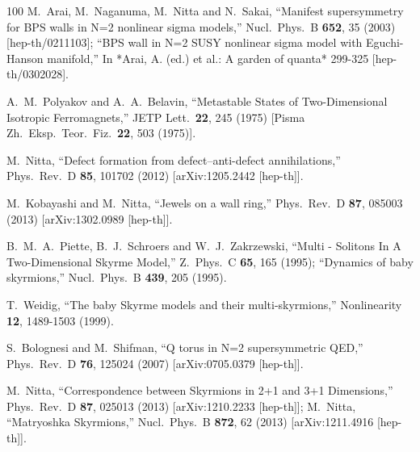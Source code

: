 \documentclass[aps,prd,preprint,
superscriptaddress]{revtex4}
\newcommand {\1}[1]{\frac{1}{#1}}
\newcommand {\2}[1]{\frac{i}{#1}}
\begin{document}
\begin{thebibliography}{100}
  M.~Arai, M.~Naganuma, M.~Nitta and N.~Sakai,
  ``Manifest supersymmetry for BPS walls in N=2 nonlinear sigma models,''  Nucl.\ Phys.\ B {\bf 652}, 35 (2003)  [hep-th/0211103];  %
  ``BPS wall in N=2 SUSY nonlinear sigma model with Eguchi-Hanson manifold,''  In *Arai, A. (ed.) et al.: A garden of quanta* 299-325  [hep-th/0302028].  %

  A.~M.~Polyakov and A.~A.~Belavin,
  ``Metastable States of Two-Dimensional Isotropic Ferromagnets,''  
JETP Lett.\  {\bf 22}, 245 (1975)  [Pisma Zh.\ Eksp.\ Teor.\ Fiz.\  {\bf 22}, 503 (1975)].  %

  M.~Nitta,
  ``Defect formation from defect--anti-defect annihilations,''  Phys.\ Rev.\ D {\bf 85}, 101702 (2012)  [arXiv:1205.2442 [hep-th]].  %

  M.~Kobayashi and M.~Nitta,
  ``Jewels on a wall ring,''  Phys.\  Rev.\ D {\bf 87}, 085003 (2013)  [arXiv:1302.0989 [hep-th]].  %


  B.~M.~A.~Piette, B.~J.~Schroers and W.~J.~Zakrzewski,
  ``Multi - Solitons In A Two-Dimensional Skyrme Model,''
  Z.\ Phys.\  C {\bf 65}, 165 (1995);
  ``Dynamics of baby skyrmions,''
  Nucl.\ Phys.\  B {\bf 439}, 205 (1995).

  T.~Weidig,
  ``The baby Skyrme models and their multi-skyrmions,''
Nonlinearity {\bf 12}, 1489-1503 (1999). 

  S.~Bolognesi and M.~Shifman,
  ``Q torus in N=2 supersymmetric QED,''  Phys.\ Rev.\ D {\bf 76}, 125024 (2007)  [arXiv:0705.0379 [hep-th]].  %

  M.~Nitta,
  ``Correspondence between Skyrmions in 2+1 and 3+1 Dimensions,''  Phys.\ Rev.\ D {\bf 87}, 025013 (2013)  [arXiv:1210.2233 [hep-th]];  %
  M.~Nitta,
  ``Matryoshka Skyrmions,''  Nucl.\  Phys.\ B {\bf 872}, 62 (2013)  [arXiv:1211.4916 [hep-th]].  %



\end{thebibliography}
\end{document}
